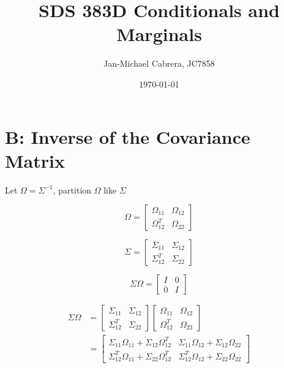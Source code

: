 \documentclass[12pt]{article}
\begin{document}
    \title{SDS 383D Conditionals and Marginals}
    \author{Jan-Michael Cabrera, JC7858}
    \date{\today}
    \maketitle

    \section*{B: Inverse of the Covariance Matrix}

    Let $\Omega = \Sigma^{-1}$, partition $\Omega$ like $\Sigma$

    \begin{equation}
        \Omega = \begin{bmatrix} \Omega_{11} & \Omega_{12} \\ \Omega_{12}^T & \Omega_{22}\end{bmatrix}
    \end{equation}

    \begin{equation}
        \Sigma = \begin{bmatrix} \Sigma_{11} & \Sigma_{12} \\ \Sigma_{12}^T & \Sigma_{22}\end{bmatrix}
    \end{equation}

    \begin{equation}
        \Sigma \Omega = \begin{bmatrix} I & 0 \\ 0 & I \end{bmatrix}
    \end{equation}

    \begin{align}
        \Sigma \Omega & =\begin{bmatrix} \Sigma_{11} & \Sigma_{12} \\ \Sigma_{12}^T & \Sigma_{22}\end{bmatrix} \begin{bmatrix} \Omega_{11} & \Omega_{12} \\ \Omega_{12}^T & \Omega_{22}\end{bmatrix} \\
        &= \begin{bmatrix} \Sigma_{11} \Omega_{11}+ \Sigma_{12} \Omega_{12}^T & \Sigma_{11} \Omega_{12} + \Sigma_{12} \Omega_{22} \\ 
            \Sigma_{12}^T \Omega_{11} + \Sigma_{22}\Omega_{12}^T & \Sigma_{12}^T \Omega_{12} + \Sigma_{22} \Omega_{22}
        \end{bmatrix}
    \end{align}
\end{document}
